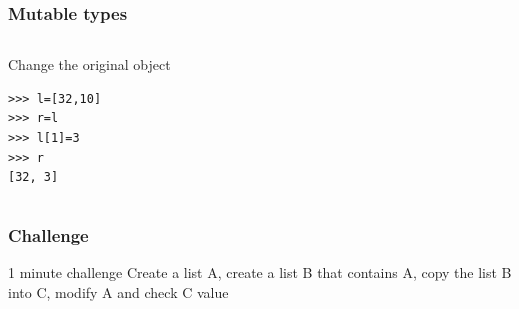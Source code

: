 \documentclass[colorlinks]{beamer}
\begin{document}
{

\begin{frame}[fragile]\frametitle{Mutable types}
\begin{columns}[T]
\begin{block}{Change the original object}
\begin{verbatim}
>>> l=[32,10]
>>> r=l
>>> l[1]=3
>>> r
[32, 3]
\end{verbatim}

\end{block}
\end{columns}

\end{frame}
}

\begin{frame}[fragile]\frametitle{Challenge}
  \begin{block}{1 minute challenge}
  Create a list A, create a list B that contains A, copy the list B into C, modify A and check C value
  \end{block}
\end{frame}

\end{document}

